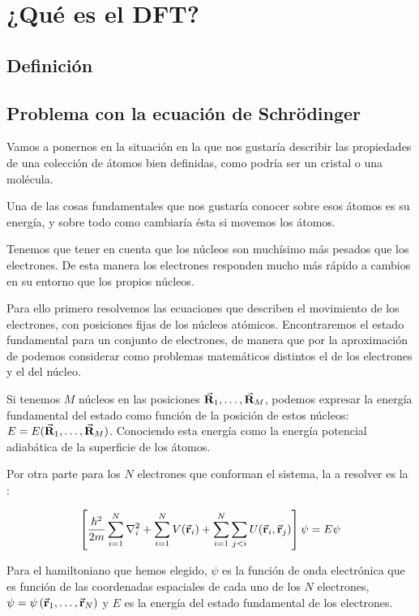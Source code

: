\section{¿Qué es el DFT?}

\subsection{Definición}

\subsection{Problema con la ecuación de Schrödinger} 

Vamos a ponernos en la situación en la que nos gustaría describir las propiedades de una colección de átomos bien definidas, como podría ser un cristal o una molécula.

Una de las cosas fundamentales que nos gustaría conocer sobre esos átomos es su energía, y sobre todo como cambiaría ésta si movemos los átomos.

Tenemos que tener en cuenta que los núcleos son muchísimo más pesados que los electrones. De esta manera los electrones responden mucho más rápido a cambios en su entorno que los propios núcleos.

Para ello primero resolvemos las ecuaciones que describen el movimiento de los electrones, con posiciones fijas de los núcleos atómicos. Encontraremos el estado fundamental para un conjunto de electrones, de manera que por la aproximación de  podemos considerar como problemas matemáticos distintos el de los electrones y el del núcleo.

Si tenemos $M$ núcleos en las posiciones $\va{R}_1 , \dots , \va{R}_M$, podemos expresar la energía fundamental del estado como función de la posición de estos núcleos: $E = E(\va{R}_1 , \dots , \va{R}_M)$. Conociendo esta energía como la energía potencial adiabática de la superficie de los átomos.

Por otra parte para los $N$ electrones que conforman el sistema, la  a resolver es la : 

\begin{equation}
    \left[ \frac{\hbar^2}{2m} \sum_{i=1}^{N} \laplacian_i + \sum_{i=1}^{N} V(\va{r}_i) + \sum_{i=1}^{N} \sum_{j<i} U(\va{r}_i , \va{r}_j) \right] \psi = E \psi
\end{equation}

Para el hamiltoniano que hemos elegido, $\psi$ es la función de onda electrónica que es función de las coordenadas espaciales de cada uno de los $N$ electrones, $\psi = \psi \left( \va{r}_{1} , \dots , \va{r}_{N} \right)$  y $E$ es la energía del estado fundamental de los electrones.

